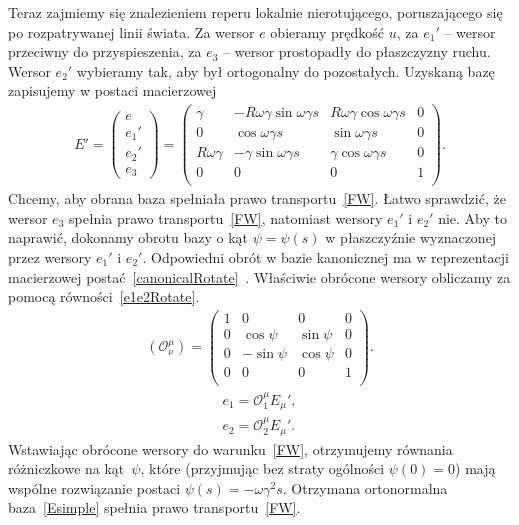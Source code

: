Teraz zajmiemy się znalezieniem reperu lokalnie nierotującego,
poruszającego się po rozpatrywanej linii świata.
Za wersor $e$ obieramy prędkość $u$, za $e_1'$ --  
wersor przeciwny do przyspieszenia, za $e_3$ -- wersor
prostopadły do płaszczyzny ruchu.
Wersor $e_2'$ wybieramy tak, aby był ortogonalny do pozostałych. 
Uzyskaną bazę zapisujemy w postaci macierzowej
\begin{align}\label{Esimpleprim}
E'=
\begin{pmatrix}
e\\
e_1'\\
e_2'\\
e_3
\end{pmatrix}
=
\begin{pmatrix}
\gamma          & -R\omega\gamma\sin\omega\gamma s  
& R\omega\gamma\cos\omega\gamma s & 0 \\
0                   & \cos\omega\gamma s                   
&  \sin\omega\gamma s                & 0 \\
R\omega\gamma  & -\gamma\sin\omega\gamma    s           
& \gamma\cos\omega\gamma s           & 0 \\
0                   &   0                                           
& 0                                      & 1 \\
\end{pmatrix}.
\end{align}
Chcemy, aby obrana baza spełniała prawo transportu~\eqref{FW}. 
Łatwo sprawdzić, że wersor $e_3$ spełnia prawo 
transportu~\eqref{FW}, natomiast wersory $e_1'$ i $e_2'$ nie.
Aby to naprawić,
dokonamy obrotu bazy o kąt $\psi=\psi(s)$ w płaszczyźnie wyznaczonej 
przez wersory $e_1'$ i $e_2'$. Odpowiedni obrót w bazie kanonicznej 
ma w reprezentacji macierzowej 
postać~\eqref{canonicalRotate}~\cite{star1993algebra}.
Właściwie obrócone wersory obliczamy za pomocą 
równości~\eqref{e1e2Rotate}.
\begin{align}\label{canonicalRotate}
( \mathcal{O}^\mu_\nu )
=
\begin{pmatrix}
1 & 0           & 0             & 0 \\
0 & \cos\psi    & \sin\psi  & 0 \\
0 & -\sin\psi   & \cos\psi  & 0 \\
0 & 0           &0          & 1 \\
\end{pmatrix}.
\end{align}
\begin{align}\label{e1e2Rotate}
e_1 =  \mathcal{O}^\mu_1 E_\mu ', \\
e_2 =  \mathcal{O}^\mu_2 E_\mu ' .\nonumber
\end{align}
Wstawiając obrócone wersory do warunku~\eqref{FW}, otrzymujemy 
równania  różniczkowe na kąt~$\psi$, które 
(przyjmując bez straty ogólności
$\psi(0)=0$) mają wspólne rozwiązanie postaci
$\psi (s) = -\omega \gamma^2 s$.
Otrzymana ortonormalna baza~\eqref{Esimple} spełnia 
prawo transportu~\eqref{FW}.

